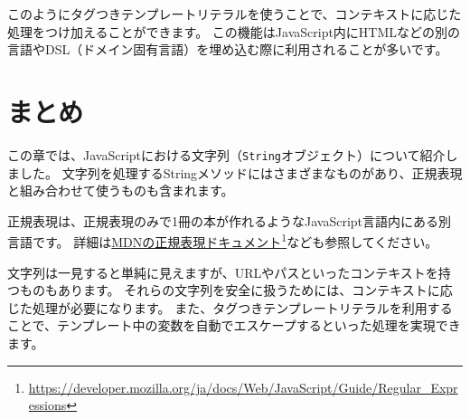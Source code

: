 このようにタグつきテンプレートリテラルを使うことで、コンテキストに応じた処理をつけ加えることができます。
この機能はJavaScript内にHTMLなどの別の言語やDSL（ドメイン固有言語）を埋め込む際に利用されることが多いです。

\hypertarget{string-summary}{%
\section{まとめ}\label{string-summary}}

この章では、JavaScriptにおける文字列（\texttt{String}オブジェクト）について紹介しました。
文字列を処理するStringメソッドにはさまざまなものがあり、正規表現と組み合わせて使うものも含まれます。

正規表現は、正規表現のみで1冊の本が作れるようなJavaScript言語内にある別言語です。
詳細は\href{https://developer.mozilla.org/ja/docs/Web/JavaScript/Guide/Regular_Expressions}{MDNの正規表現ドキュメント}\footnote{\url{https://developer.mozilla.org/ja/docs/Web/JavaScript/Guide/Regular_Expressions}}なども参照してください。

文字列は一見すると単純に見えますが、URLやパスといったコンテキストを持つものもあります。
それらの文字列を安全に扱うためには、コンテキストに応じた処理が必要になります。
また、タグつきテンプレートリテラルを利用することで、テンプレート中の変数を自動でエスケープするといった処理を実現できます。
